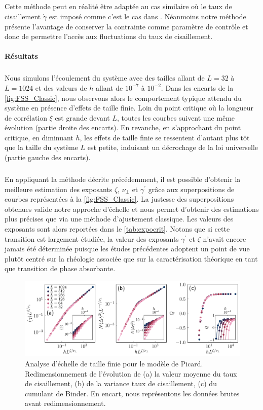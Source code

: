 \subparagraph{}Cette méthode peut en réalité être adaptée au cas similaire où le taux de cisaillement $\dot{\gamma}$ est imposé comme c'est le cas dans \cite{lin_scaling_2014}. Néanmoins notre méthode présente l'avantage de conserver la contrainte comme paramètre de contrôle et donc de permettre l'accès aux fluctuations du taux de cisaillement.

\paragraph{Résultats}

\subparagraph{}Nous simulons l'écoulement du système avec des tailles allant de $L=32$ à $L=1024$ et des valeurs de $h$ allant de $10^{-7}$ à $10^{-2}$. Dans les encarts de la \autoref{fig:FSS_Classic}, nous observons alors le comportement typique attendu du système en présence d'effets de taille finie. Loin du point critique où la longueur de corrélation $\xi$ est grande devant $L$, toutes les courbes suivent une même évolution (partie droite des encarts). En revanche, en s'approchant du point critique, en diminuant $h$, les effets de taille finie se ressentent d'autant plus tôt que la taille du système $L$ est petite, induisant un décrochage de la loi universelle (partie gauche des encarts).



\subparagraph{}En appliquant la méthode décrite précédemment, il est possible d'obtenir la meilleure estimation des exposants $\zeta$, $\nu_\perp$ et $\gamma^\prime$ grâce aux superpositions de courbes représentées à la \autoref{fig:FSS_Classic}. La justesse des superpositions obtenues valide notre approche d'échelle et  nous permet d'obtenir des estimations plus précises que via une méthode d'ajustement classique. Les valeurs des exposants sont alors reportées dans le \autoref{tab:expocrit}. Notons que si cette transition est largement étudiée, la valeur des exposants $\gamma^\prime$ et $\zeta$ n'avait encore jamais été déterminée puisque les études précédentes adoptent un point de vue plutôt centré sur la rhéologie associée que sur la caractérisation théorique en tant que transition de phase absorbante.

\begin{figure}[h]
	\centering
	\includegraphics[width=\textwidth]{Chapitre4/Figures/CasPhysique/FSS_Classic_edited.pdf}
	\caption{Analyse d'échelle de taille finie pour le modèle de Picard. Redimensionnement de l'évolution de (a) la valeur moyenne du taux de cisaillement, (b) de la variance taux de cisaillement, (c) du cumulant de Binder. En encart, nous représentons les données brutes avant redimensionnement.}
	\label{fig:FSS_Classic}
\end{figure}

